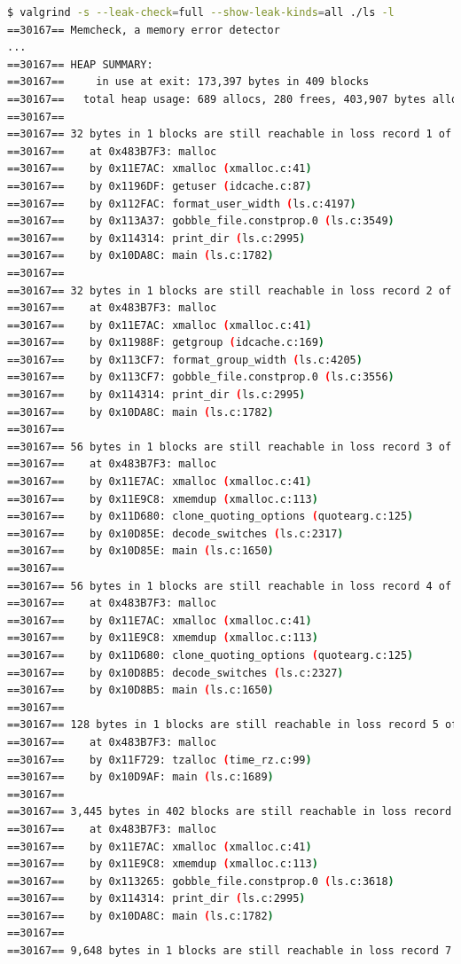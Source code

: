 \documentclass{article}
\begin{document}
\begin{lstlisting}[language=bash]
$ valgrind -s --leak-check=full --show-leak-kinds=all ./ls -l
==30167== Memcheck, a memory error detector
...
==30167== HEAP SUMMARY:
==30167==     in use at exit: 173,397 bytes in 409 blocks
==30167==   total heap usage: 689 allocs, 280 frees, 403,907 bytes allocated
==30167== 
==30167== 32 bytes in 1 blocks are still reachable in loss record 1 of 8
==30167==    at 0x483B7F3: malloc 
==30167==    by 0x11E7AC: xmalloc (xmalloc.c:41)
==30167==    by 0x1196DF: getuser (idcache.c:87)
==30167==    by 0x112FAC: format_user_width (ls.c:4197)
==30167==    by 0x113A37: gobble_file.constprop.0 (ls.c:3549)
==30167==    by 0x114314: print_dir (ls.c:2995)
==30167==    by 0x10DA8C: main (ls.c:1782)
==30167== 
==30167== 32 bytes in 1 blocks are still reachable in loss record 2 of 8
==30167==    at 0x483B7F3: malloc 
==30167==    by 0x11E7AC: xmalloc (xmalloc.c:41)
==30167==    by 0x11988F: getgroup (idcache.c:169)
==30167==    by 0x113CF7: format_group_width (ls.c:4205)
==30167==    by 0x113CF7: gobble_file.constprop.0 (ls.c:3556)
==30167==    by 0x114314: print_dir (ls.c:2995)
==30167==    by 0x10DA8C: main (ls.c:1782)
==30167== 
==30167== 56 bytes in 1 blocks are still reachable in loss record 3 of 8
==30167==    at 0x483B7F3: malloc 
==30167==    by 0x11E7AC: xmalloc (xmalloc.c:41)
==30167==    by 0x11E9C8: xmemdup (xmalloc.c:113)
==30167==    by 0x11D680: clone_quoting_options (quotearg.c:125)
==30167==    by 0x10D85E: decode_switches (ls.c:2317)
==30167==    by 0x10D85E: main (ls.c:1650)
==30167== 
==30167== 56 bytes in 1 blocks are still reachable in loss record 4 of 8
==30167==    at 0x483B7F3: malloc 
==30167==    by 0x11E7AC: xmalloc (xmalloc.c:41)
==30167==    by 0x11E9C8: xmemdup (xmalloc.c:113)
==30167==    by 0x11D680: clone_quoting_options (quotearg.c:125)
==30167==    by 0x10D8B5: decode_switches (ls.c:2327)
==30167==    by 0x10D8B5: main (ls.c:1650)
==30167== 
==30167== 128 bytes in 1 blocks are still reachable in loss record 5 of 8
==30167==    at 0x483B7F3: malloc 
==30167==    by 0x11F729: tzalloc (time_rz.c:99)
==30167==    by 0x10D9AF: main (ls.c:1689)
==30167== 
==30167== 3,445 bytes in 402 blocks are still reachable in loss record 6 of 8
==30167==    at 0x483B7F3: malloc 
==30167==    by 0x11E7AC: xmalloc (xmalloc.c:41)
==30167==    by 0x11E9C8: xmemdup (xmalloc.c:113)
==30167==    by 0x113265: gobble_file.constprop.0 (ls.c:3618)
==30167==    by 0x114314: print_dir (ls.c:2995)
==30167==    by 0x10DA8C: main (ls.c:1782)
==30167== 
==30167== 9,648 bytes in 1 blocks are still reachable in loss record 7 of 8

\end{lstlisting}
\end{document}
